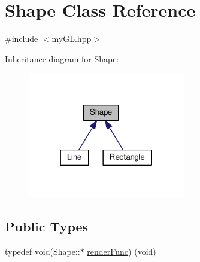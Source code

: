 \hypertarget{classShape}{}\section{Shape Class Reference}
\label{classShape}


{\ttfamily \#include $<$my\+G\+L.\+hpp$>$}



Inheritance diagram for Shape\+:
\nopagebreak
\begin{figure}[H]
\begin{center}
\leavevmode
\includegraphics[width=194pt]{classShape__inherit__graph}
\end{center}
\end{figure}
\subsection*{Public Types}
\begin{DoxyCompactItemize}
\item 
typedef void(Shape\+::$\ast$ \hyperlink{classShape_ab0227d9b119beea793bce34ba3e0b5b8}{render\+Func}) (void)
\end{DoxyCompactItemize}
